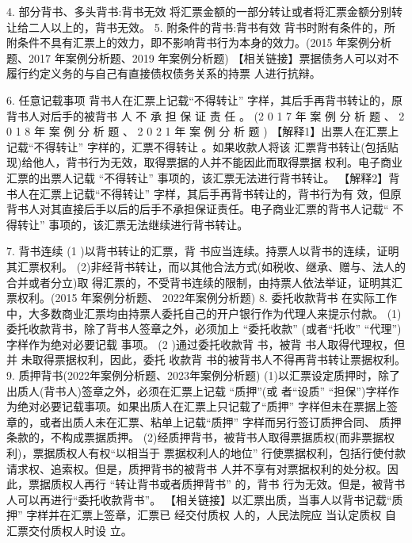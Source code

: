 \documentclass[UTF8,12pt]{ctexart}
\numberwithin{equation}{section} %
\numberwithin{figure}{section}
\numberwithin{table}{section}
\begin{document}
	4. 部分背书、多头背书:背书无效 将汇票金额的一部分转让或者将汇票金额分别转让给二人以上的，背书无效。
	5. 附条件的背书:背书有效 背书时附有条件的，所附条件不具有汇票上的效力，即不影响背书行为本身的效力。(2015 年案例分析题、2017 年案例分析题、2019 年案例分析题)
	【相关链接】票据债务人可以对不履行约定义务的与自己有直接债权债务关系的持票 人进行抗辩。
	
	6. 任意记载事项
	背书人在汇票上记载“不得转让” 字样，其后手再背书转让的，原背书人对后手的被背书 人 不 承 担 保 证 责 任 。 (2 0 1 7 年 案 例 分 析 题 、 2 0 1 8 年 案 例 分 析 题 、 2 0 2 1 年 案 例 分 析 题 )
	【解释1】出票人在汇票上记载“不得转让” 字样的，汇票不得转让 。如果收款人将该 汇票背书转让(包括贴现)给他人，背书行为无效，取得票据的人并不能因此而取得票据 权利。电子商业汇票的出票人记载 “不得转让” 事项的，该汇票无法进行背书转让。 【解释2】背书人在汇票上记载“不得转让” 字样，其后手再背书转让的，背书行为有 效，但原背书人对其直接后手以后的后手不承担保证责任。电子商业汇票的背书人记载“ 不 得转让” 事项的，该汇票无法继续进行背书转让。
	
	7. 背书连续
	(1 )以背书转让的汇票，背 书应当连续。持票人以背书的连续，证明其汇票权利。 (2)非经背书转让，而以其他合法方式(如税收、继承、赠与、法人的合并或者分立)取 得汇票的，不受背书连续的限制，由持票人依法举证，证明其汇票权利。(2015 年案例分析题、 2022年案例分析题)
	8. 委托收款背书 在实际工作中，大多数商业汇票均由持票人委托自己的开户银行作为代理人来提示付款。 (1)委托收款背书，除了背书人签章之外，必须加上 “委托收款” (或者“托收” “代理”) 字样作为绝对必要记载 事项。
	(2 )通过委托收款背 书，被背 书人取得代理权，但并 未取得票据权利，因此，委托 收款背 书的被背书人不得再背书转让票据权利。
	9. 质押背书(2022年案例分析题、2023年案例分析题) (1)以汇票设定质押时，除了出质人(背书人)签章之外，必须在汇票上记载 “质押”(或 者“设质” “担保”)字样作为绝对必要记载事项。如果出质人在汇票上只记载了“质押” 字样但未在票据上签章的，或者出质人未在汇票、粘单上记载“质押” 字样而另行签订质押合同、 质押条款的，不构成票据质押。 (2)经质押背书，被背书人取得票据质权(而非票据权利)，票据质权人有权“以相当于 票据权利人的地位” 行使票据权利，包括行使付款请求权、追索权。但是，质押背书的被背书 人并不享有对票据权利的处分权。因此，票据质权人再行 “转让背书或者质押背书” 的，背书 行为无效。但是，被背书人可以再进行“委托收款背书”。 【相关链接】以汇票出质，当事人以背书记载“质押” 字样并在汇票上签章，汇票已 经交付质权 人的，人民法院应 当认定质权 自汇票交付质权人时设 立。
	
\end{document}
